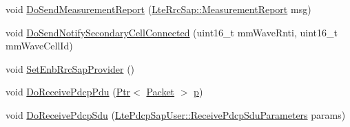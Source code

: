 \begin{DoxyCompactItemize}
\item 
void \hyperlink{classns3_1_1MmWaveLteUeRrcProtocolReal_a6b106b803fabfb284ec0b20c01be0a40}{Do\+Send\+Measurement\+Report} (\hyperlink{structns3_1_1LteRrcSap_1_1MeasurementReport}{Lte\+Rrc\+Sap\+::\+Measurement\+Report} msg)
\item 
void \hyperlink{classns3_1_1MmWaveLteUeRrcProtocolReal_a3867751da392f836f7deea034af22f2e}{Do\+Send\+Notify\+Secondary\+Cell\+Connected} (uint16\+\_\+t mm\+Wave\+Rnti, uint16\+\_\+t mm\+Wave\+Cell\+Id)
\item 
void \hyperlink{classns3_1_1MmWaveLteUeRrcProtocolReal_adbb0955b254fae63826a9f90c8dc2113}{Set\+Enb\+Rrc\+Sap\+Provider} ()
\item 
void \hyperlink{classns3_1_1MmWaveLteUeRrcProtocolReal_a3b85cc74846fb108ca8f9f6accbcc60c}{Do\+Receive\+Pdcp\+Pdu} (\hyperlink{classns3_1_1Ptr}{Ptr}$<$ \hyperlink{classns3_1_1Packet}{Packet} $>$ \hyperlink{lte__link__budget__x2__handover__measures_8m_ac9de518908a968428863f829398a4e62}{p})
\item 
void \hyperlink{classns3_1_1MmWaveLteUeRrcProtocolReal_a0d01ab34aa20d94722942a29289176f1}{Do\+Receive\+Pdcp\+Sdu} (\hyperlink{structns3_1_1LtePdcpSapUser_1_1ReceivePdcpSduParameters}{Lte\+Pdcp\+Sap\+User\+::\+Receive\+Pdcp\+Sdu\+Parameters} params)
\end{DoxyCompactItemize}
